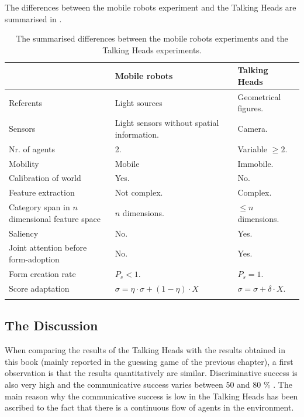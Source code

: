 The differences between the mobile robots experiment and the Talking Heads are summarised in .

\begin{table}
\centering
\begin{tabular}{p{3cm}p{4cm}l}
\lsptoprule
 & {\sc Mobile robots} & {\sc Talking Heads}\\\midrule
Referents & Light sources & Geometrical figures.\\\hline
Sensors & Light sensors without spatial information. & Camera.\\\hline
Nr. of agents & 2. & Variable $\geq 2$.\\\hline
Mobility & Mobile & Immobile.\\\hline
Calibration of world & Yes. & No.\\\hline
Feature extraction & Not complex. & Complex.\\\hline
Category span in $n$ dimensional feature space & $n$ dimensions. & $\leq n$ dimensions.\\\hline
Saliency & No. & Yes.\\\hline
Joint attention before form-adoption & No. & Yes.\\\hline
Form creation rate & $P_s<1$. & $P_s=1$.\\\hline
Score adaptation & $\sigma = \eta \cdot \sigma + (1-\eta) \cdot X$ & $\sigma = \sigma + \delta \cdot X$.\\%
\lspbottomrule
\end{tabular}
\caption{The summarised differences between the mobile robots experiments and the Talking Heads experiments.}
\label{t:disc:differences}
\end{table}


\subsection{The Discussion}

When comparing the results of the Talking Heads \citep{steels:2000,kaplan:2000} with the results obtained in this book (mainly reported in the guessing game of the previous chapter), a first observation is that the results quantitatively are similar. Discriminative success is also very high \citep{steels:2000} and the communicative success varies between 50 and 80 \% \citep{kaplan:2000}. The main reason why the communicative success is low in the Talking Heads has been ascribed to the fact that there is a continuous flow of agents in the environment.

